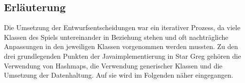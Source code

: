 \subsection{Erläuterung}
\label{sub:fachkonzept-implementierung-erläuterung}


Die Umsetzung der Entwurfsentscheidungen war ein iterativer Prozess, da viele Klassen des Spiels untereinander in Beziehung stehen und oft nachträgliche Anpassungen in den jeweiligen Klassen vorgenommen werden mussten. Zu den drei grundlegenden Punkten der Javaimplementierung in Star Greg gehören die Verwendung von Hashmaps, die Verwendung generischer Klassen und die Umsetzung der Datenhaltung. Auf sie wird im Folgenden näher eingegangen.







\autorende{}